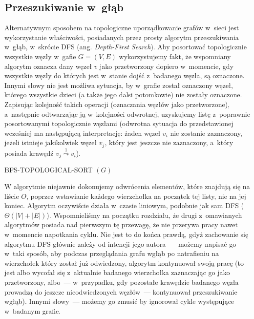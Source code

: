\subsection{Przeszukiwanie w~głąb}


Alternatywnym sposobem na topologiczne uporządkowanie grafów w~sieci jest wykorzystanie właściwości, posiadanych przez prosty algorytm przeszukiwania w~głąb, w~skrócie \textsf{DFS} (ang. \textit{Depth-First Search}).
Aby posortować topologicznie wszystkie węzły w~gafie $G = \left( V, E \right)$ wykorzystujemy fakt, że wspomniany algorytm oznacza dany węzeł $v$ jako przetworzony dopiero w~momencie, gdy wszystkie węzły do których jest w~stanie dojść z~badanego węzła, są oznaczone.
Innymi słowy nie jest możliwa sytuacja, by w~grafie został oznaczony węzeł, którego wszystkie dzieci (a także jego dalsi potomkowie) nie zostały oznaczone.
Zapisując kolejność takich operacji (oznaczania węzłów jako przetworzone), a~następnie odtwarzając ją w~kolejności odwrotnej, uzyskujemy listę z~poprawnie posortowanymi topologicznie węzłami (odwrotna sytuacja do przedstawionej wcześniej ma następującą interpretację: żaden węzeł $v_{i}$ nie zostanie zaznaczony, jeżeli istnieje jakikolwiek węzeł $v_{j}$, który jest jeszcze nie zaznaczony, a~który posiada krawędź $v_{j} \overset{1} \leadsto v_{i}$).

\begin{pseudokod}[!htbp]
	\DontPrintSemicolon
	\caption{
		BFS-TOPOLOGICAL-SORT $\left( G \right)$
	}
	\label{alg:BFSTopologicalSort}
\end{pseudokod}

W algorytmie niejawnie dokonujemy odwrócenia elementów, które znajdują się na liście $O$, poprzez wstawianie każdego wierzchołka na początek tej listy, nie na jej koniec.
Algorytm oczywiście działa w~czasie liniowym, podobnie jak sam \textsf{DFS} ($ \Theta \left( \left| V \right| + \left| E \right| \right)$). Wspomnieliśmy na początku rozdziału, że drugi z~omawianych algorytmów posiada nad pierwszym tę przewagę, że nie przerywa pracy nawet w~momencie napotkania cyklu.
Nie jest to do końca prawdą, gdyż zachowanie się algorytmu \textsf{DFS} głównie zależy od intencji jego autora~--- możemy napisać go w~taki sposób, aby podczas przeglądania grafu wgłąb po natrafieniu na wierzchołek który został już odwiedzony, algorytm kontynuował swoją pracę (to jest albo wycofał się z~aktualnie badanego wierzchołka zaznaczając go jako przetworzony, albo~--- w~przypadku, gdy pozostałe krawędzie badanego węzła prowadzą do jeszcze nieodwiedzonych węzłów~--- kontynuował przeszukiwanie wgłąb).
Innymi słowy~--- możemy go zmusić by ignorował cykle występujące w~badanym grafie.

